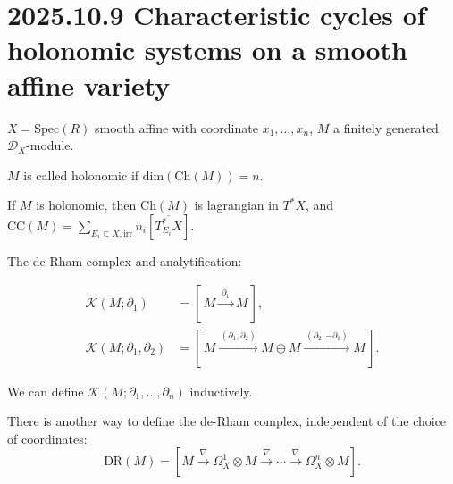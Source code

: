 \documentclass[12pt]{amsart}
\numberwithin{equation}{section}
\newcommand{\CK}{{\mathcal {K}}} \newcommand{\CL}{{\mathcal {L}}} \newcommand{\CM}{{\mathcal {M}}}
\renewcommand{\bar}{\overline}
\begin{document}
\section{2025.10.9 Characteristic cycles of holonomic systems on a smooth affine variety}


$X = \mathrm{Spec}(R)$ smooth affine with coordinate $x_1,\ldots,x_n$, $M$ a finitely generated $\mathcal{D}_X$-module. 
\begin{defn}
  $M$ is called holonomic if $\mathrm{dim}(\mathrm{Ch}(M)) = n$.
\end{defn}

\begin{cor}
  If $M$ is holonomic, then $\mathrm{Ch}(M)$ is lagrangian in $T^*X$, and $\mathrm{CC}(M) = \sum_{E_i \subseteq X,  \textrm{irr}} n_i [\bar{T^*_{E_i}X}]$.
\end{cor}

The de-Rham complex and  analytification:

\begin{align*}
  \CK(M;\partial_1)
  &= [\, M \xrightarrow{\;\partial_1\;} M \,], \\[4pt]
  \CK(M;\partial_1,\partial_2)
  &= [\, 
      M
      \xrightarrow{\,(\partial_1,\partial_2)\,}
      M \oplus M
      \xrightarrow{\,(\partial_2,-\partial_1)\,}
      M
     \,].
\end{align*}

We can define $\CK(M;\partial_1,\ldots,\partial_n)$ inductively.

There is another way to define the de-Rham complex, independent of the choice of coordinates:
\[\mathrm{DR}(M) = [M \xrightarrow{\;\nabla\;} \Omega^1_X \otimes M \xrightarrow{\;\nabla\;} \cdots \xrightarrow{\;\nabla\;} \Omega^n_X \otimes M].\] 
  
\end{document}
